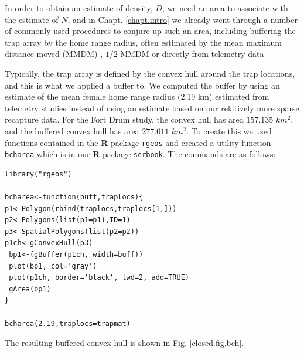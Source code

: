 In order to obtain an estimate of density, $D$, we need an area to
associate with the estimate of $N$, and in Chapt.  \ref{chapt.intro}
we already went through a number of commonly used procedures to
conjure up such an area, including buffering the trap array by the
home range radius, often estimated by the mean maximum distance moved
(MMDM) \citep{parmenter_etal:2003}, $1/2$ MMDM \citep{dice:1938} or
directly from telemetry data \citep{wallace_etal:2003}

Typically, the trap array is defined by the convex hull around the
trap locations, and this is what we applied a buffer to. We computed
the buffer by using an estimate of the mean female home range radius
(2.19 km) estimated from telemetry studies \citep{bales_etal:2005}
instead of using an estimate based on our relatively more sparse
recapture data.  For the Fort Drum study, the convex hull has area
$157.135$ $km^2$, and the buffered convex hull has area $277.011$
$km^2$.  To create this we used functions contained in the {\bf R}
package \mbox{\tt rgeos} and created a utility function \mbox{\tt
  bcharea} which is in our {\bf R} package \mbox{\tt scrbook}. The
commands are as follows:
\begin{verbatim}
library("rgeos")

bcharea<-function(buff,traplocs){
p1<-Polygon(rbind(traplocs,traplocs[1,]))
p2<-Polygons(list(p1=p1),ID=1)
p3<-SpatialPolygons(list(p2=p2))
p1ch<-gConvexHull(p3)
 bp1<-(gBuffer(p1ch, width=buff))
 plot(bp1, col='gray')
 plot(p1ch, border='black', lwd=2, add=TRUE)
 gArea(bp1)
}

bcharea(2.19,traplocs=trapmat)
\end{verbatim}
The resulting buffered convex hull is shown in Fig. \ref{closed.fig.bch}.

